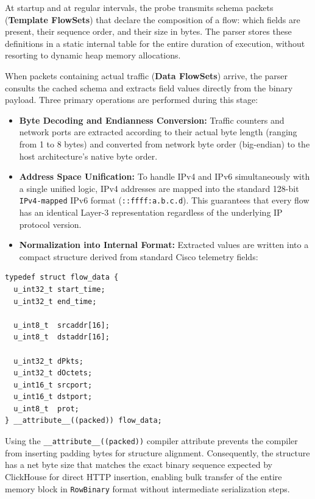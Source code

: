\documentclass[11pt,a4paper]{article}
\newenvironment{codebox}[1][]{%
    \begin{tcolorbox}[
        colback=codebg,
        colframe=codeframe,
        boxrule=0.6pt,
        arc=1.5mm,
        left=3mm,
        right=3mm,
        top=2mm,
        bottom=2mm,
        fonttitle=\sffamily\bfseries\footnotesize,
        coltitle=chibadark,
        colbacktitle=codeframe!50!white,
        #1
    ]
}{%
    \end{tcolorbox}
}
\begin{document}
At startup and at regular intervals, the probe transmits schema packets (\textbf{Template FlowSets}) that declare the composition of a flow: which fields are present, their sequence order, and their size in bytes. The parser stores these definitions in a static internal table for the entire duration of execution, without resorting to dynamic heap memory allocations.

When packets containing actual traffic (\textbf{Data FlowSets}) arrive, the parser consults the cached schema and extracts field values directly from the binary payload. Three primary operations are performed during this stage:
\begin{itemize}
    \item \textbf{Byte Decoding and Endianness Conversion:} Traffic counters and network ports are extracted according to their actual byte length (ranging from 1 to 8 bytes) and converted from network byte order (big-endian) to the host architecture's native byte order.
    \item \textbf{Address Space Unification:} To handle IPv4 and IPv6 simultaneously with a single unified logic, IPv4 addresses are mapped into the standard 128-bit \texttt{IPv4-mapped} IPv6 format (\texttt{::ffff:a.b.c.d}). This guarantees that every flow has an identical Layer-3 representation regardless of the underlying IP protocol version.
    \item \textbf{Normalization into Internal Format:} Extracted values are written into a compact structure derived from standard Cisco telemetry fields:
\end{itemize}

\begin{codebox}[title={Internal Flow Record Structure (\texttt{include/flow.h})}]
\footnotesize
\begin{verbatim}
typedef struct flow_data {
  u_int32_t start_time;
  u_int32_t end_time;

  u_int8_t  srcaddr[16];
  u_int8_t  dstaddr[16];

  u_int32_t dPkts;
  u_int32_t dOctets;
  u_int16_t srcport;
  u_int16_t dstport;
  u_int8_t  prot;
} __attribute__((packed)) flow_data;
\end{verbatim}
\end{codebox}

Using the \texttt{\_\_attribute\_\_((packed))} compiler attribute prevents the compiler from inserting padding bytes for structure alignment. Consequently, the structure has a net byte size that matches the exact binary sequence expected by ClickHouse for direct HTTP insertion, enabling bulk transfer of the entire memory block in \texttt{RowBinary} format without intermediate serialization steps.
\end{document}

